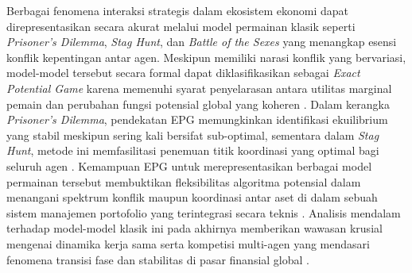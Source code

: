 Berbagai fenomena interaksi strategis dalam ekosistem ekonomi dapat direpresentasikan secara akurat melalui model permainan klasik seperti \textit{Prisoner's Dilemma}, \textit{Stag Hunt}, dan \textit{Battle of the Sexes} yang menangkap esensi konflik kepentingan antar agen. Meskipun memiliki narasi konflik yang bervariasi, model-model tersebut secara formal dapat diklasifikasikan sebagai \textit{Exact Potential Game} karena memenuhi syarat penyelarasan antara utilitas marginal pemain dan perubahan fungsi potensial global yang koheren \cite{monderer_potential_1996}. Dalam kerangka \textit{Prisoner's Dilemma}, pendekatan EPG memungkinkan identifikasi ekuilibrium yang stabil meskipun sering kali bersifat sub-optimal, sementara dalam \textit{Stag Hunt}, metode ini memfasilitasi penemuan titik koordinasi yang optimal bagi seluruh agen \cite{sarkar_quantum_2018}. Kemampuan EPG untuk merepresentasikan berbagai model permainan tersebut membuktikan fleksibilitas algoritma potensial dalam menangani spektrum konflik maupun koordinasi antar aset di dalam sebuah sistem manajemen portofolio yang terintegrasi secara teknis \cite{jain_multi-portfolio_2012}. Analisis mendalam terhadap model-model klasik ini pada akhirnya memberikan wawasan krusial mengenai dinamika kerja sama serta kompetisi multi-agen yang mendasari fenomena transisi fase dan stabilitas di pasar finansial global \cite{galam_ising_2010}.

